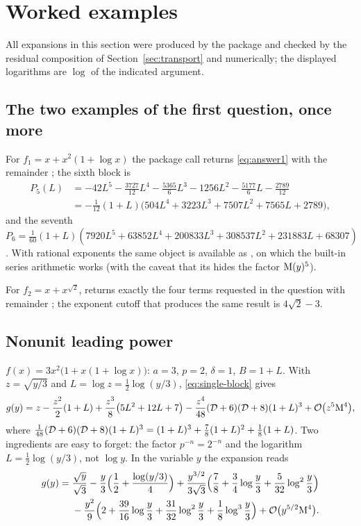 \section{Worked examples}
\label{sec:examples}

All expansions in this section were produced by the package and checked by the residual composition of Section~\ref{sec:transport} and numerically; the displayed logarithms are $\log$ of the indicated argument.

\subsection{The two examples of the first question, once more}

For $f_1=x+x^2(1+\log x)$ the package call  returns \eqref{eq:answer1} with the remainder ; the sixth block is
\begin{align*}
 P_5(L)&=-42L^5-\tfrac{3727}{12}L^4-\tfrac{5365}{6}L^3-1256L^2-\tfrac{5177}{6}L-\tfrac{2789}{12}\\
 &=-\tfrac1{12}(1+L)\bigl(504L^4+3223L^3+7507L^2+7565L+2789\bigr),
\end{align*}
and the seventh $P_6=\tfrac1{60}(1+L)(7920L^5+63852L^4+200833L^3+308537L^2+231883L+68307)$. With rational exponents the same object is available as , on which the built-in series arithmetic works (with the caveat that its  hides the factor $\mathrm M(y)^5$).

For $f_2=x+x^{\sqrt2}$,  returns exactly the four terms requested in the question with remainder ; the exponent cutoff that produces the same result is $4\sqrt2-3$.

\subsection{Nonunit leading power}

$f(x)=3x^2\bigl(1+x(1+\log x)\bigr)$: $a=3$, $p=2$, $\delta=1$, $B=1+L$. With $z=\sqrt{y/3}$ and $L=\log z=\tfrac12\log(y/3)$, \eqref{eq:single-block} gives
\begin{equation}
 g(y)=z-\frac{z^2}{2}(1+L)+\frac{z^3}{8}\bigl(5L^2+12L+7\bigr)-\frac{z^4}{48}(\mathcal D+6)(\mathcal D+8)(1+L)^3+\mathcal O\bigl(z^5\mathrm M^4\bigr),
 \label{eq:nonunit}
\end{equation}
where $\tfrac1{48}(\mathcal D+6)(\mathcal D+8)(1+L)^3=(1+L)^3+\tfrac78(1+L)^2+\tfrac18(1+L)$. Two ingredients are easy to forget: the factor $p^{-n}=2^{-n}$ and the logarithm $L=\tfrac12\log(y/3)$, not $\log y$. In the variable $y$ the expansion reads
\begin{align*}
 g(y)={}&\frac{\sqrt y}{\sqrt3}-\frac y3\Bigl(\frac12+\frac{\log(y/3)}{4}\Bigr)+\frac{y^{3/2}}{3\sqrt3}\Bigl(\frac78+\frac34\log\frac y3+\frac5{32}\log^2\frac y3\Bigr)\\
 &-\frac{y^2}{9}\Bigl(2+\frac{39}{16}\log\frac y3+\frac{31}{32}\log^2\frac y3+\frac18\log^3\frac y3\Bigr)+\mathcal O\bigl(y^{5/2}\mathrm M^4\bigr).
\end{align*}

